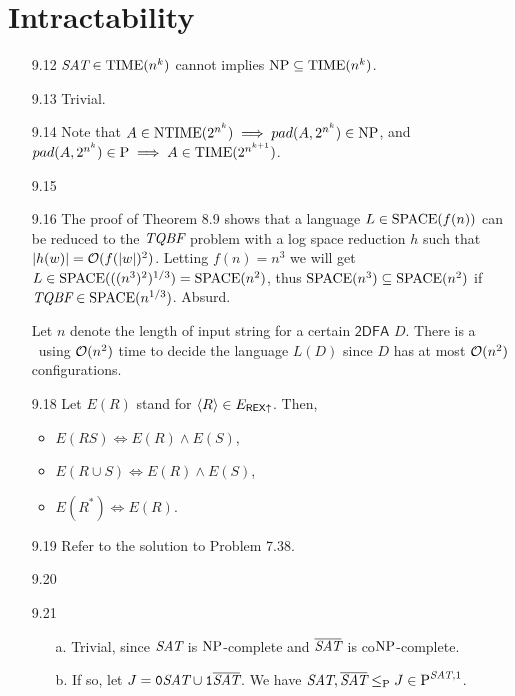 \section{Intractability}

\begin{itemize}
	
	\item[9.12]
	$\textit{SAT} \in \textrm{TIME}(n^k)$ cannot implies $\textrm{NP} \subseteq \textrm{TIME}(n^k)$.
	
	\item[9.13]
	Trivial. 
	
	\item[9.14]
	Note that $A \in \textrm{NTIME}(2^{n^k}) \implies pad(A, 2^{n^k}) \in \textrm{NP}$, and $pad(A, 2^{n^k}) \in \textrm{P} \implies A \in \textrm{TIME}(2^{n^{k+1}})$.
	
	\item[9.15]
	\Omit
	
	\item[9.16]
	The proof of Theorem 8.9 shows that a language $L \in \textrm{SPACE}(f(n))$ can be reduced to the $\textit{TQBF}$ problem with a log space reduction $h$ such that $|h(w)| = \mathcal{O}(f(|w|)^2)$. Letting $f(n) = n^3$ we will get $L \in \textrm{SPACE}(((n^3)^2)^{1/3}) = \textrm{SPACE}(n^2)$, thus $\textrm{SPACE}(n^3) \subseteq \textrm{SPACE}(n^2)$ if $\textit{TQBF} \in \textrm{SPACE}(n^{1/3})$. Absurd. 
	
	\item[\Star 9.17]
	Let $n$ denote the length of input string for a certain $\mathsf{2DFA}$ $D$. There is a \TM\ using $\mathcal{O}(n^2)$ time to decide the language $L(D)$ since $D$ has at most $\mathcal{O}(n^2)$ configurations.
	
	\item[9.18]
	Let $E(R)$ stand for $\langle {R} \rangle \in E_{\textsf{REX} \uparrow}$. Then,
	\begin{itemize}
		\item $E(RS) \iff E(R) \wedge E(S)$,
		\item $E(R \cup S) \iff E(R) \wedge E(S)$,
		\item $E(R^*) \iff E(R)$.
	\end{itemize}

	\item[9.19]
	Refer to the solution to Problem 7.38.
	
	\item[9.20]
	\Empty
	
	\item[9.21]
	\begin{itemize}
		\item[a.] Trivial, since $\textit{SAT}$ is $\textrm{NP}$-complete and $\overline{\textit{SAT}}$ is co$\textrm{NP}$-complete.
		\item[b.] If so, let $J = \texttt{0} \textit{SAT} \cup \texttt{1} \overline{\textit{SAT}}$. We have $\textit{SAT}, \overline{\textit{SAT}} \leq_{\textrm{P}} J \in \textrm{P}^{\textit{SAT},1}$.
	\end{itemize}


\end{itemize}

